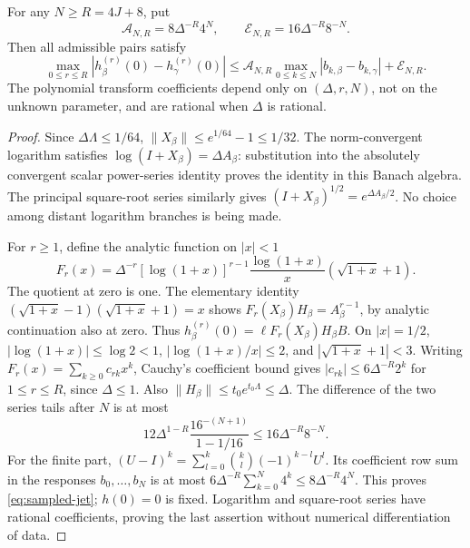 \begin{lemma}
\label{lem:sampled-log}
For any $N\ge R=4J+8$, put
\begin{equation}
 \mathcal A_{N,R}=8\Delta^{-R}4^N,\qquad
 \mathcal E_{N,R}=16\Delta^{-R}8^{-N}.
 \label{eq:sampled-constants}
\end{equation}
Then all admissible pairs satisfy
\begin{equation}
 \max_{0\le r\le R}|h_\beta^{(r)}(0)-h_\gamma^{(r)}(0)|
 \le\mathcal A_{N,R}\max_{0\le k\le N}|b_{k,\beta}-b_{k,\gamma}|
                +\mathcal E_{N,R}.
 \label{eq:sampled-jet}
\end{equation}
The polynomial transform coefficients depend only on $(\Delta,r,N)$, not on
the unknown parameter, and are rational when $\Delta$ is rational.
\end{lemma}
\begin{proof}
Since $\Delta\Lambda\le1/64$,
$\|X_\beta\|\le e^{1/64}-1\le1/32$. The norm-convergent logarithm satisfies
$\log(I+X_\beta)=\Delta A_\beta$: substitution into the absolutely convergent
scalar power-series identity proves the identity in this Banach algebra.
The principal square-root series similarly gives
$(I+X_\beta)^{1/2}=e^{\Delta A_\beta/2}$. No choice among distant logarithm
branches is being made.

For $r\ge1$, define the analytic function on $|x|<1$
\begin{equation}
 F_r(x)=\Delta^{-r}[\log(1+x)]^{r-1}
              \frac{\log(1+x)}{x}(\sqrt{1+x}+1).
 \label{eq:sampled-function}
\end{equation}
The quotient at zero is one. The elementary identity
$(\sqrt{1+x}-1)(\sqrt{1+x}+1)=x$ shows
$F_r(X_\beta)H_\beta=A_\beta^{r-1}$, by analytic continuation also at zero.
Thus $h_\beta^{(r)}(0)=\ell F_r(X_\beta)H_\beta B$.
On $|x|=1/2$, $|\log(1+x)|\le\log2<1$,
$|\log(1+x)/x|\le2$, and $|\sqrt{1+x}+1|<3$.
Writing $F_r(x)=\sum_{k\ge0}c_{rk}x^k$, Cauchy's coefficient bound gives
$|c_{rk}|\le6\Delta^{-R}2^k$ for $1\le r\le R$, since $\Delta\le1$.
Also $\|H_\beta\|\le t_0e^{t_0\Lambda}\le\Delta$.
The difference of the two series tails after $N$ is at most
\[
 12\Delta^{1-R}\frac{16^{-(N+1)}}{1-1/16}
       \le16\Delta^{-R}8^{-N}.
\]
For the finite part, $(U-I)^k=\sum_{l=0}^k\binom kl(-1)^{k-l}U^l$.
Its coefficient row sum in the responses $b_0,\ldots,b_N$ is at most
$6\Delta^{-R}\sum_{k=0}^N4^k\le8\Delta^{-R}4^N$.
This proves \eqref{eq:sampled-jet}; $h(0)=0$ is fixed.
Logarithm and square-root series have rational coefficients, proving the last
assertion without numerical differentiation of data.
\end{proof}

